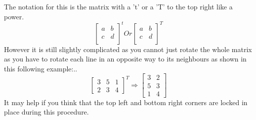 \documentclass{article}
\begin{document}
The notation for this is the matrix with a 't' or a 'T' to the top right like a power.
\begin{equation*}
	\left[
	\begin{matrix}
		a & b\\
		c & d\\
	\end{matrix}
	\right]^t
	Or
	\left[
	\begin{matrix}
		a & b\\
		c & d\\
	\end{matrix}
	\right]^T
\end{equation*}
However it is still slightly complicated as you cannot just rotate the whole matrix as you have to rotate each line in an opposite way to its neighbours as shown in this following example:..
\begin{equation*}
	\left[
		\begin{matrix}
			3 & 5 & 1\\
			2 & 3 & 4
			\end{matrix}
	\right]^T
	\Rightarrow
	\left[
		\begin{matrix}
			3 & 2\\
			5 & 3\\
			1 & 4
			\end{matrix}
	\right]
\end{equation*}
It may help if you think that the top left and bottom right corners are locked in place during this procedure.
\end{document}
